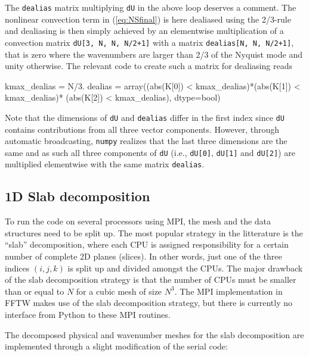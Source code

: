 \documentclass[11pt, oneside]{article}
\newcommand{\inpyth}{\lstinline[keywordstyle={}, basicstyle=\ttfamily]} %[]%
\begin{document}
The \inpyth{dealias} matrix multiplying \inpyth{dU} in the above
loop deserves a comment.
The nonlinear convection term in (\ref{eq:NSfinal}) is here dealiased using the 2/3-rule \cite{orzag71} and dealiasing is then simply achieved by an elementwise multiplication of a convection matrix \inpyth{dU[3, N, N, N/2+1]} with a matrix \inpyth{dealias[N, N, N/2+1]}, that is zero where the wavenumbers are larger than 2/3 of the Nyquist mode and unity otherwise. The relevant code to create such a matrix for dealiasing reads

\begin{python}
kmax_dealias = N/3.
dealias = array((abs(K[0]) < kmax_dealias)*(abs(K[1]) < kmax_dealias)*
                (abs(K[2]) < kmax_dealias), dtype=bool)
\end{python}
Note that the dimensions of \inpyth{dU} and \inpyth{dealias} differ in the first index since \inpyth{dU} contains contributions from all three vector components. However, through automatic broadcasting, \texttt{numpy} realizes that the last three dimensions are the same and as such all three components of \inpyth{dU} (i.e.,  \inpyth{dU[0]}, \inpyth{dU[1]} and  \inpyth{dU[2]}) are multiplied elementwise with the same matrix \inpyth{dealias}.

\subsection{1D Slab decomposition}
\label{slab1D}

To run the code on several processors using MPI, the mesh and the data structures need to be split up. The most popular strategy in the litterature is the ``slab'' decomposition, where each CPU is assigned responsibility for a certain number of complete 2D planes (slices). In other words, just one of the three indices $(i,j,k)$ is split up and divided amongst the CPUs. The major drawback of the slab decomposition strategy is that the number of CPUs must be smaller than or equal to $N$ for a cubic mesh of size $N^3$. The MPI implementation in FFTW makes use of the slab decomposition strategy, but there is currently no interface from Python to these MPI routines.

The decomposed physical and wavenumber meshes for the slab decomposition are implemented through a slight modification of the serial code:
\end{document}
